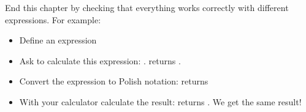 \documentclass[11pt,class=report,crop=false]{standalone}
\begin{document}
\bigskip
\bigskip

End this chapter by checking that everything works correctly with different expressions.
For example:
\begin{itemize}
  \item Define an expression 
  \item Ask \Python{} to calculate this expression: . \Python{} returns .
  \item Convert the expression to Polish notation:  returns  
  
  \item With your calculator calculate the result:  returns . We get the same result!
  \end{itemize}
  
\end{document}
